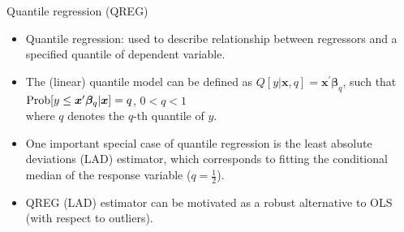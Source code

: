\documentclass{beamer}
\begin{document}
\begin{frame}{Quantile regression (QREG)}
\begin{itemize}
\item Quantile regression: used to describe relationship between regressors and a specified quantile of dependent variable.
\medskip
\item The (linear) quantile model can be defined as $Q[y|\bm{x}, q]=\bm{x}^{\prime}\bm{\beta}_q$, such that $\textnormal{Prob}[y \le \bm{x}^{\prime}\bm{\beta}_q|\bm{x}]=q$, $0<q<1$ \\where $q$ denotes the $q$-th quantile of $y$.
\medskip
\item One important special case of quantile regression is the least absolute deviations (LAD) estimator, which corresponds to fitting the conditional median of the response variable ($q=\frac{1}{2}$).
\medskip
\item QREG (LAD) estimator can be motivated as a robust  alternative to OLS (with respect to outliers).
\end{itemize}
\end{frame}
\end{document}
